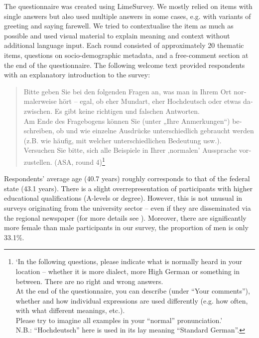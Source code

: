 \documentclass[output=paper,colorlinks, citecolor=brown]{langscibook}
\begin{document}
The questionnaire was created using LimeSurvey. We mostly relied on items with single answers but also used multiple answers in some cases, e.g. with variants of greeting and saying farewell. We tried to contextualise the item as much as possible and used visual material to explain meaning and context without additional language input. Each round consisted of approximately 20 thematic items, questions on socio\hyp demographic metadata, and a free-comment section at the end of the questionnaire. The following welcome text provided respondents with an explanatory introduction to the survey:

\begin{quote}
\foreignlanguage{ngerman}{Bitte geben Sie bei den folgenden Fragen an, was man in Ihrem Ort normalerweise hört – egal, ob eher Mundart, eher Hochdeutsch oder etwas dazwischen. Es gibt keine richtigen und falschen Antworten.\\
Am Ende des Fragebogens können Sie (unter „Ihre Anmerkungen“) beschreiben, ob und wie einzelne Ausdrücke unterschiedlich gebraucht werden (z.B. wie häufig, mit welcher unterschiedlichen Bedeutung usw.).\\
Versuchen Sie bitte, sich alle Beispiele in Ihrer ‚normalen’ Aussprache vorzustellen.} (ASA, round 4)\footnote{`In the following questions, please indicate what is normally heard in your location – whether it is more dialect, more High German or something in between. There are no right and wrong answers.\\
At the end of the questionnaire, you can describe (under ``Your comments''), whether and how individual expressions are used differently (e.g. how often, with what different meanings, etc.).\\
Please try to imagine all examples in your “normal” pronunciation.'\\
N.B.: “Hochdeutsch” here is used in its lay meaning “Standard German”.}
\end{quote}

Respondents’ average age (40.7 years) roughly corresponds to that of the federal state (43.1 years). There is a slight overrepresentation of participants with higher educational qualifications (A-levels or degree). However, this is not unusual in surveys originating from the university sector – even if they are disseminated via the regional newspaper (for more details see \citealt[112--114]{NiehausEtAl2022}). Moreover, there are significantly more female than male participants in our survey, the proportion of men is only 33.1\%.
\end{document}
